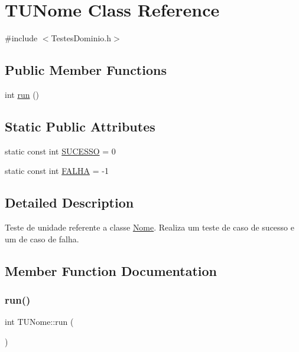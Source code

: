 \hypertarget{class_t_u_nome}{}\section{T\+U\+Nome Class Reference}
\label{class_t_u_nome}


{\ttfamily \#include $<$Testes\+Dominio.\+h$>$}

\subsection*{Public Member Functions}
\begin{DoxyCompactItemize}
\item 
int \hyperlink{class_t_u_nome_ae20734cb15f71890e57aff02a00f6313}{run} ()
\end{DoxyCompactItemize}
\subsection*{Static Public Attributes}
\begin{DoxyCompactItemize}
\item 
static const int \hyperlink{class_t_u_nome_af1d3faa5a4f6a302f96d193478f3013b}{S\+U\+C\+E\+S\+SO} = 0
\item 
static const int \hyperlink{class_t_u_nome_a50bf8928bc5e773eaf15a2fb5eb2f065}{F\+A\+L\+HA} = -\/1
\end{DoxyCompactItemize}


\subsection{Detailed Description}
Teste de unidade referente a classe \hyperlink{class_nome}{Nome}. Realiza um teste de caso de sucesso e um de caso de falha. 

\subsection{Member Function Documentation}
\mbox{\label{class_t_u_nome_ae20734cb15f71890e57aff02a00f6313}} 
\subsubsection{\texorpdfstring{run()}{run()}}
{\footnotesize\ttfamily int T\+U\+Nome\+::run (\begin{DoxyParamCaption}{ }\end{DoxyParamCaption})}



